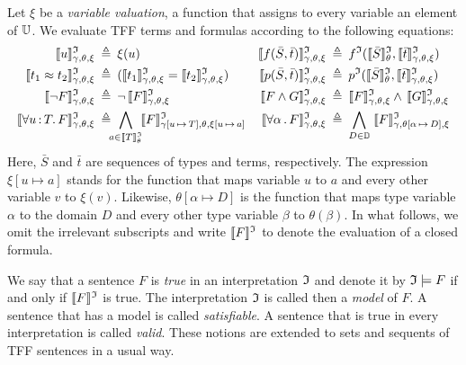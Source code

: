 Let $\xi$ be a {\em variable valuation}, a function that assigns
to every variable an element of $\univ$. We evaluate TFF terms
and formulas according to the following equations:
\begin{align*}
\eval{u} &\eqdef \xi(u) &
\eval{f(\bar{S},\bar{t})} &\eqdef f^\cI(\evalT{\bar{S}},\eval{\bar{t}}) \\
\eval{t_1 \approx t_2} &\eqdef (\eval{t_1} = \eval{t_2}) &
\eval{p(\bar{S},\bar{t})} &\eqdef p^\cI(\evalT{\bar{S}},\eval{\bar{t}}) \\
\eval{\lnot F} &\eqdef \lnot\, \eval{F} &
\eval{F \land G} &\eqdef \eval{F} \land\, \eval{G} \\
\eval{\forall u \ty T .\, F} &\eqdef \!\!\!\!
\bigwedge_{a \in \evalT{T}} \!
\llb F \rrb^\cI_{\gamma[u\,\mapsto\,T],\theta,\xi[u\,\mapsto\,a]} &
\eval{\forall \alpha \,.\, F} &\eqdef
\bigwedge_{D \in \sorts}\;
\llb F \rrb^\cI_{\gamma,\theta[\alpha\,\mapsto\,D],\xi}
\end{align*}
Here, $\bar{S}$ and $\bar{t}$ are sequences of types and terms, respectively.
The expression $\xi[u \mapsto a]$ stands for the function that
maps variable $u$ to $a$ and every other variable $v$ to $\xi(v)$.
Likewise, $\theta[\alpha \mapsto D]$ is the function that maps
type variable $\alpha$ to the domain $D$ and every other type
variable $\beta$ to $\theta(\beta)$. In what follows,
we omit the irrelevant subscripts and write $\evalG{F}$
to denote the evaluation of a closed formula.

We say that a sentence $F$ is {\em true} in an interpretation $\cI$
and denote it by $\cI \models F$ if and only if $\evalG{F}$ is true.
The interpretation $\cI$ is called then a {\em model\/} of $F$.
A sentence that has a model is called {\em satisfiable}.
A sentence that is true in every interpretation is called {\em valid}.
These notions are extended to sets and sequents of TFF sentences in
a usual way.

